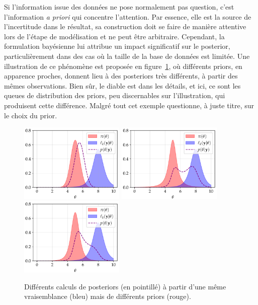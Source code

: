 
Si l'information issue des données ne pose normalement pas question, c'est l'information \emph{a priori} qui concentre l'attention. Par essence, elle est la source de l'incertitude dans le résultat,  sa construction doit se faire de manière attentive lors de l'étape de modélisation et ne peut être arbitraire. 
Cependant, la formulation bayésienne lui attribue un impact significatif sur le posterior, particulièrement dans des cas où la taille de la base de données est limitée. Une illustration de ce phénomène est proposée en figure~\ref{fig:intro-differentsposteriors}, où différents priors, en apparence proches, donnent lieu à des posteriors très différents, à partir des mêmes observations.
Bien sûr, le diable est dans les détails, et ici, ce sont les queues de distribution des priors, peu discernables sur l'illustration, qui produisent cette différence. Malgré tout cet exemple questionne,  à juste titre, sur le choix du prior.

\begin{figure}[h]
    \centering
    \includegraphics[width=5cm]{figures/intro/posterior1.pdf}
    \includegraphics[width=5cm]{figures/intro/posterior2.pdf}
    \includegraphics[width=5cm]{figures/intro/posterior3.pdf}   
    \caption{Différents calculs de posteriors (en pointillé) à partir d'une même vraisemblance (bleu) mais de différents priors (rouge).%
    }
    \label{fig:intro-differentsposteriors}
\end{figure}


